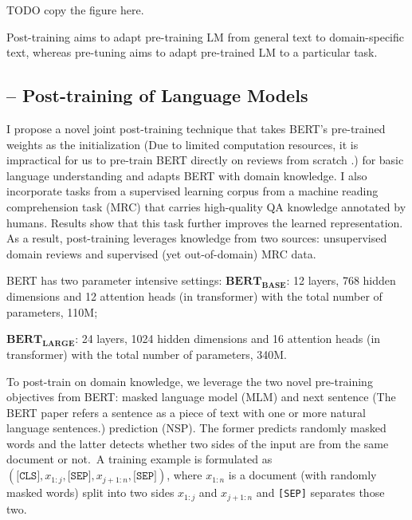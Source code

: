 TODO copy the figure here.

Post-training aims to adapt pre-training LM from general text to domain-specific text, whereas pre-tuning aims to adapt pre-trained LM to a particular task.

\subsection{-- Post-training of Language Models}
\label{chap4:sec:post-training}

I propose a novel joint post-training technique that takes BERT's pre-trained weights as the initialization (Due to limited computation resources, it is impractical for us to pre-train BERT directly on reviews from scratch \cite{devlin2018bert}.) for basic language understanding and adapts BERT with domain knowledge.
I also incorporate tasks from a supervised learning corpus from a machine reading comprehension task (MRC) that carries high-quality QA knowledge annotated by humans.
Results show that this task further improves the learned representation.
As a result, post-training leverages knowledge from two sources: unsupervised domain reviews and supervised (yet out-of-domain) MRC data.

BERT has two parameter intensive settings:
\noindent
$\textbf{BERT}_\textbf{BASE}$: 12 layers, 768 hidden dimensions and 12 attention heads (in transformer) with the total number of parameters, 110M;

\noindent
$\textbf{BERT}_\textbf{LARGE}$: 24 layers, 1024 hidden dimensions and 16 attention heads (in transformer) with the total number of parameters, 340M.


To post-train on domain knowledge, we leverage the two novel pre-training objectives from BERT: masked language model (MLM) and next sentence (The BERT paper refers a sentence as a piece of text with one or more natural language sentences.) prediction (NSP). The former predicts randomly masked words and the latter detects whether two sides of the input are from the same document or not.~A training example is formulated as $(\texttt{[CLS]}, x_{1:j}, \texttt{[SEP]}, x_{j+1:n}, \texttt{[SEP]})$, where $x_{1:n}$ is a document (with randomly masked words) split into two sides $x_{1:j}$ and $x_{j+1:n}$ and \texttt{[SEP]} separates those two.

